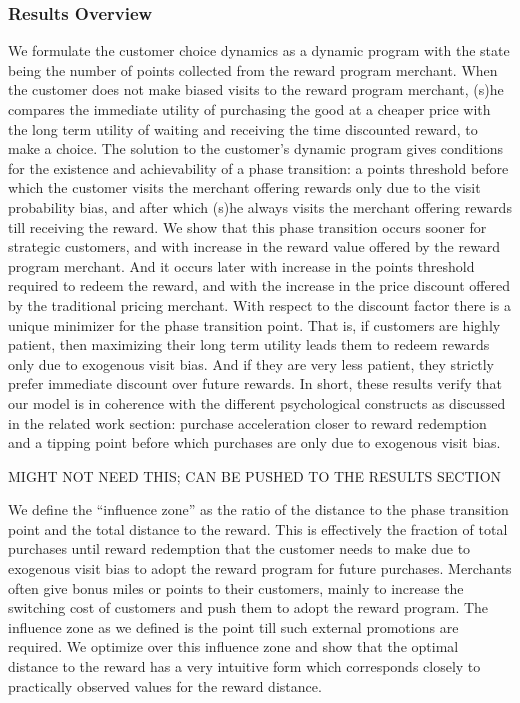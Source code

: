 \subsubsection{Results Overview}
We formulate the customer choice dynamics as a dynamic program with the state being the number of points collected from the reward program merchant.
When the customer does not make biased visits to the reward program merchant, (s)he compares the immediate utility of purchasing the good at a cheaper price with the long term utility of waiting and receiving the time discounted reward, to make a choice. 
The solution to the customer's dynamic program gives conditions for the existence and achievability of a phase transition: a points threshold before which the customer visits the merchant offering rewards only due to the visit probability bias, and after which (s)he always visits the merchant offering rewards till receiving the reward.
We show that this phase transition occurs sooner for strategic customers, and with increase in the reward value offered by the reward program merchant.
And it occurs later with increase in the points threshold required to redeem the reward, and with the increase in the price discount offered by the traditional pricing merchant.
With respect to the discount factor there is a unique minimizer for the phase transition point. That is, if customers are highly patient, then maximizing their long term utility leads them to redeem rewards only due to exogenous visit bias.
And if they are very less patient, they strictly prefer immediate discount over future rewards.
In short, these results verify that our model is in coherence with the different psychological constructs as discussed in the related work section: purchase acceleration closer to reward redemption and a tipping point before which purchases are only due to exogenous visit bias.

{\arpit MIGHT NOT NEED THIS; CAN BE PUSHED TO THE RESULTS SECTION

We define the ``influence zone'' as the ratio of the distance to the phase transition  point and the total distance to the reward.
This is effectively the fraction of total purchases until reward redemption that the customer needs to make due to exogenous visit bias to adopt the reward program for future purchases.
Merchants often give bonus miles or points to their customers, mainly to increase the switching cost of customers and push them to adopt the reward program.
The influence zone as we defined is the point till such external promotions are required.
We optimize over this influence zone and show that the optimal distance to the reward has a very intuitive form which corresponds closely to practically observed values for the reward distance.
}

